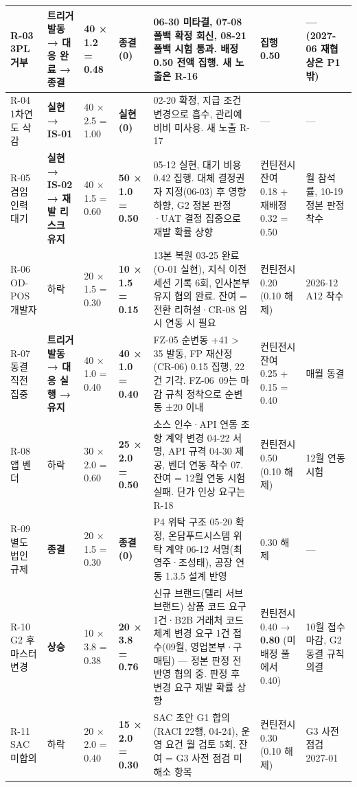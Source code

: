 \documentclass[10pt,a4paper]{article}
\begin{document}
{\begin{longtable}{|L{20mm}|L{30mm}|L{30mm}|L{24mm}|L{88mm}|L{28mm}|L{32mm}|}
R-03 3PL 거부 & \textbf{트리거 발동 → 대응 완료 → 종결} & 40 × 1.2 = 0.48 & \textbf{종결 (0)} & 06-30 미타결, 07-08 폴백 확정 회신, 08-21 폴백 시험 통과. 배정 0.50 전액 집행. 새 노출은 R-16 & 집행 0.50 & — (2027-06 재협상은 P1 밖) \\ \hline
R-04 1차연도 삭감 & \textbf{실현 → IS-01} & 40 × 2.5 = 1.00 & \textbf{실현 (0)} & 02-20 확정, 지급 조건 변경으로 흡수, 관리예비비 미사용. 새 노출 R-17 & — & — \\ \hline
R-05 겸임 인력 대기 & \textbf{실현 → IS-02 → 재발 리스크 유지} & 40 × 1.5 = 0.60 & \textbf{50 × 1.0 = 0.50} & 05-12 실현, 대기 비용 0.42 집행. 대체 결정권자 지정(06-03) 후 영향 하향, G2 정본 판정·UAT 결정 집중으로 재발 확률 상향 & 컨틴전시 잔여 0.18 + 재배정 0.32 = 0.50 & 월 참석률, 10-19 정본 판정 착수 \\ \hline
R-06 OD-POS 개발자 & 하락 & 20 × 1.5 = 0.30 & \textbf{10 × 1.5 = 0.15} & 13본 복원 03-25 완료(O-01 실현), 지식 이전 세션 기록 6회, 인사본부 유지 협의 완료. 잔여 = 전환 리허설·CR-08 임시 연동 시 필요 & 컨틴전시 0.20 (0.10 해제) & 2026-12 A12 착수 \\ \hline
R-07 동결 직전 집중 & \textbf{트리거 발동 → 대응 실행 → 유지} & 40 × 1.0 = 0.40 & \textbf{40 × 1.0 = 0.40} & FZ-05 순변동 +41 > 35 발동, FP 재산정(CR-06) 0.15 집행, 22건 기각. FZ-06~09는 마감 규칙 정착으로 순변동 ±20 이내 & 컨틴전시 잔여 0.25 + 0.15 = 0.40 & 매월 동결 \\ \hline
R-08 앱 벤더 & 하락 & 30 × 2.0 = 0.60 & \textbf{25 × 2.0 = 0.50} & 소스 인수·API 연동 조항 계약 변경 04-22 서명, API 규격 04-30 제공, 벤더 연동 착수 07. 잔여 = 12월 연동 시험 실패. 단가 인상 요구는 R-18 & 컨틴전시 0.50 (0.10 해제) & 12월 연동 시험 \\ \hline
R-09 별도 법인 규제 & \textbf{종결} & 20 × 1.5 = 0.30 & \textbf{종결 (0)} & P4 위탁 구조 05-20 확정, 온담푸드시스템 위탁 계약 06-12 서명(최영주·조성태), 공장 연동 1.3.5 설계 반영 & 0.30 해제 & — \\ \hline
R-10 G2 후 마스터 변경 & \textbf{상승} & 10 × 3.8 = 0.38 & \textbf{20 × 3.8 = 0.76} & 신규 브랜드(델리 서브 브랜드) 상품 코드 요구 1건·B2B 거래처 코드 체계 변경 요구 1건 접수(09월, 영업본부·구매팀) — 정본 판정 전 반영 협의 중. 판정 후 변경 요구 재발 확률 상향 & 컨틴전시 0.40 → \textbf{0.80} (미배정 풀에서 0.40) & 10월 접수 마감, G2 동결 규칙 의결 \\ \hline
R-11 SAC 미합의 & 하락 & 20 × 2.0 = 0.40 & \textbf{15 × 2.0 = 0.30} & SAC 초안 G1 합의(RACI 22행, 04-24), 운영 요건 월 검토 5회. 잔여 = G3 사전 점검 미해소 항목 & 컨틴전시 0.30 (0.10 해제) & G3 사전 점검 2027-01 \\ \hline

\end{longtable}}
\end{document}
